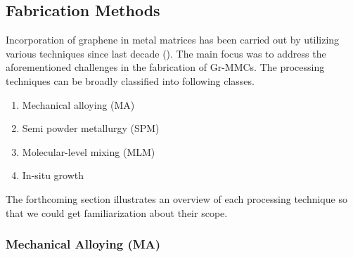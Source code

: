 \subsection{Fabrication Methods}

Incorporation of graphene in metal matrices has been carried out by utilizing various techniques since last decade (\cite{nieto2012synthesis, hu2016graphene, kumar2014graphene}). The main focus was to address the aforementioned challenges in the fabrication of Gr-MMCs. The processing techniques can be broadly classified 
into following classes.

\begin{enumerate}
\item Mechanical alloying (MA)
\item Semi powder metallurgy (SPM)
\item Molecular-level mixing (MLM) 
\item In-situ growth
\end{enumerate}

The forthcoming section illustrates an overview of each processing technique so that we could get familiarization about their scope.


\subsubsection{Mechanical Alloying (MA)}

